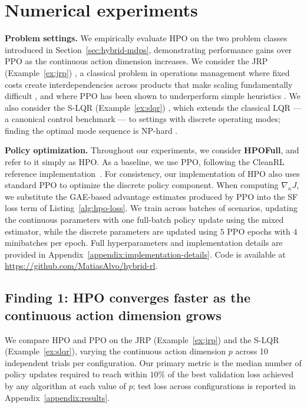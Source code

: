 \documentclass{article}
\theoremstyle{definition}
\theoremstyle{remark}
\begin{document}
\section{Numerical experiments}
\label{sec:numerical-exps}

{\bf Problem settings.} We empirically evaluate HPO on the two problem classes introduced in 
Section~\ref{sec:hybrid-mdps}, demonstrating performance gains over PPO as the continuous 
action dimension increases. We consider the JRP (Example~\ref{ex:jrp}) 
\citep{goyal1989joint}, a classical problem in operations management where fixed costs 
create interdependencies across products that make scaling fundamentally difficult 
\citep{ata2025computational}, and where PPO has been shown to underperform simple 
heuristics \citep{vanvuchelen2023use}. We also consider the S-LQR 
(Example~\ref{ex:slqr}) \citep{zhang2009value}, which extends the classical LQR 
\citep{kalman1960contributions} --- a canonical control benchmark --- to settings with discrete operating modes; finding the 
optimal mode sequence is NP-hard \citep{zhang2011infinite}.
 
{\bf Policy optimization.} Throughout our experiments, we consider \textbf{HPOFull},
and refer to it simply as HPO. As a baseline, we use PPO, following the CleanRL reference implementation~\citep{huang2022cleanrl}.
For consistency, our implementation of HPO also uses standard PPO to optimize the discrete policy
component. When computing $\nabla_\kappa J$, we substitute the GAE-based advantage estimates  produced by PPO into the SF loss term of Listing~\ref{alg:hpo-loss}. We train across
batches of scenarios, updating the continuous parameters with one full-batch policy update using the
mixed estimator, while the discrete parameters are updated using $5$ PPO epochs with $4$
minibatches per epoch. Full hyperparameters and implementation details are provided in
Appendix~\ref{appendix:implementation-details}. Code is available at
\url{https://github.com/MatiasAlvo/hybrid-rl}.
 
\subsection{Finding 1: HPO converges faster as the continuous action dimension grows}
\label{sec:performance-results}
 
We compare HPO and PPO on the JRP (Example~\ref{ex:jrp}) and the
 S-LQR (Example~\ref{ex:slqr}), varying the continuous action dimension $p$ across
10 independent trials per configuration. Our primary metric is the median number of policy
updates required to reach within $10\%$ of the best validation loss achieved by any algorithm
at each value of $p$; test loss across configurations is reported in Appendix~\ref{appendix:results}.
\end{document}
